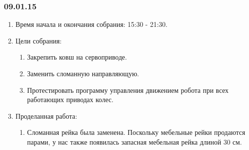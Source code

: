 \subsubsection{09.01.15}
\begin{enumerate}
	
	\item Время начала и окончания собрания: 15:30 - 21:30.
	
	\item Цели собрания: 
	\begin{enumerate}
		
		\item Закрепить ковш на сервоприводе.
		
		\item Заменить сломанную направляющую.
		
		\item Протестировать программу управления движением робота при всех работающих приводах колес.
		
	\end{enumerate}

	\item Проделанная работа:
	\begin{enumerate}
		
		\item Сломанная рейка была заменена. Поскольку мебельные рейки продаются парами, у нас также появилась запасная мебельная рейка длиной 30 см.
		

\end{enumerate}
\end{enumerate}
